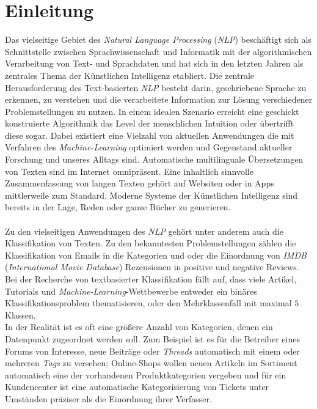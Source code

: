 \documentclass[a4paper,11pt]{article}
\begin{document}
\section{Einleitung}

Das vielseitige Gebiet des \textit{Natural Language Processing} (\textit{NLP}) beschäftigt sich als Schnittstelle zwischen Sprachwissenschaft und Informatik mit der algorithmischen Verarbeitung von Text- und Sprachdaten und hat sich in den letzten Jahren als zentrales Thema der Künstlichen Intelligenz etabliert. Die zentrale Herausforderung des Text-basierten \textit{NLP} besteht darin, geschriebene Sprache zu erkennen, zu verstehen und die verarbeitete Information zur Lösung verschiedener Problemstellungen zu nutzen. In einem idealen Szenario erreicht eine geschickt konstruierte Algorithmik das Level der menschlichen Intuition oder übertrifft diese sogar. Dabei existiert eine Vielzahl von aktuellen Anwendungen die mit Verfahren des \textit{Machine-Learning} optimiert werden und Gegenstand aktueller Forschung und unseres Alltags sind. Automatische multilinguale Übersetzungen von Texten sind im Internet omnipräsent. Eine inhaltlich sinnvolle Zusammenfassung von langen Texten gehört auf Websiten oder in Apps mittlerweile zum Standard. Moderne Systeme der Künstlichen Intelligenz sind bereits in der Lage, Reden oder ganze Bücher zu generieren. \\
\\
Zu den vielseitigen Anwendungen des \textit{NLP} gehört unter anderem auch die Klassifikation von Texten. Zu den bekanntesten Problemstellungen zählen die Klassifikation von Emails in die Kategorien  und  oder die Einordnung von \textit{IMDB} (\textit{International Movie Database}) Rezensionen in positive und negative Reviews. Bei der Recherche von textbasierter Klassifikation fällt auf, dass viele Artikel, Tutorials und \textit{Machine-Learning}-Wettbewerbe entweder ein binäres Klassifikationsproblem thematisieren, oder den Mehrklassenfall mit maximal $5$ Klassen. \\
In der Realität ist es oft eine größere Anzahl von Kategorien, denen ein Datenpunkt zugeordnet werden soll. Zum Beispiel ist es für die Betreiber eines Forums von Interesse, neue Beiträge oder \textit{Threads} automatisch mit einem oder mehreren \textit{Tags} zu versehen; Online-Shops wollen neuen Artikeln im Sortiment automatisch eine der vorhandenen Produktkategorien vergeben und für ein Kundencenter ist eine automatische Kategorisierung von Tickets unter Umständen präziser als die Einordnung ihrer Verfasser. \\
\end{document}
